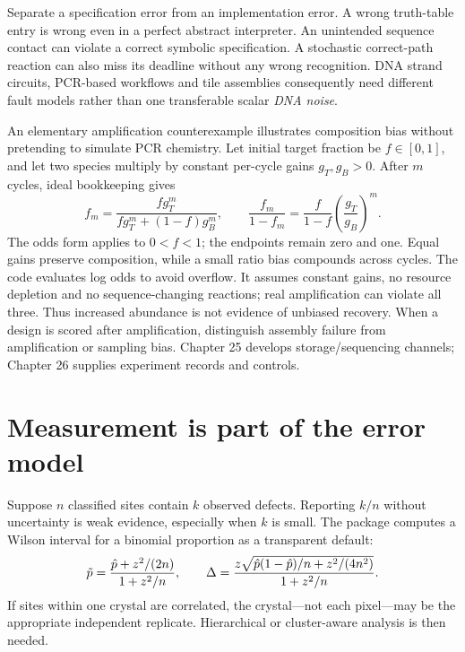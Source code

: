 Separate a specification error from an implementation error. A wrong truth-table
entry is wrong even in a perfect abstract interpreter. An unintended sequence
contact can violate a correct symbolic specification. A stochastic correct-path
reaction can also miss its deadline without any wrong recognition. DNA strand
circuits, PCR-based workflows and tile assemblies consequently need different
fault models rather than one transferable scalar \emph{DNA noise}.

An elementary amplification counterexample illustrates composition bias without
pretending to simulate PCR chemistry. Let initial target fraction be $f\in[0,1]$,
and let two species multiply by constant per-cycle gains $g_T,g_B>0$. After $m$
cycles, ideal bookkeeping gives
\begin{equation}
f_m=\frac{f g_T^m}{f g_T^m+(1-f)g_B^m},\qquad
\frac{f_m}{1-f_m}=\frac{f}{1-f}\left(\frac{g_T}{g_B}\right)^m.
\label{dnad23:gain}
\end{equation}
The odds form applies to $0<f<1$; the endpoints remain zero and one.
Equal gains preserve composition, while a small ratio bias compounds across cycles.
The code evaluates log odds to avoid overflow. It assumes constant gains, no
resource depletion and no sequence-changing reactions; real amplification can
violate all three. Thus increased abundance is not evidence of unbiased recovery.
When a design is scored after amplification, distinguish assembly failure from
amplification or sampling bias. Chapter 25 develops storage/sequencing channels;
Chapter 26 supplies experiment records and controls.

\section{Measurement is part of the error model}

Suppose $n$ classified sites contain $k$ observed defects. Reporting $k/n$ without
uncertainty is weak evidence, especially when $k$ is small. The package computes a
Wilson interval for a binomial proportion as a transparent default:
\[
\tilde p={\hat p+z^2/(2n)\over1+z^2/n},\qquad
\Delta={z\sqrt{\hat p(1-\hat p)/n+z^2/(4n^2)}\over1+z^2/n}.
\]
If sites within one crystal are correlated, the crystal—not each pixel—may be the
appropriate independent replicate. Hierarchical or cluster-aware analysis is then
needed.

